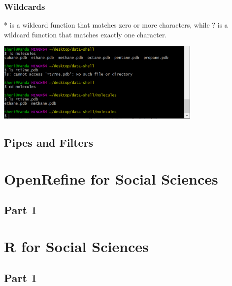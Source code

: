 \documentclass{article}
\begin{document}
\subsubsection{Wildcards}
* is a wildcard function that matches zero or more characters, while ? is a wildcard function that matches exactly one character.

\includegraphics[width=10cm]{Images/GitBash_027.PNG}

\subsection{Pipes and Filters}




\section{OpenRefine for Social Sciences}
\subsection{Part 1}


\section{R for Social Sciences}
\subsection{Part 1}
\end{document}
